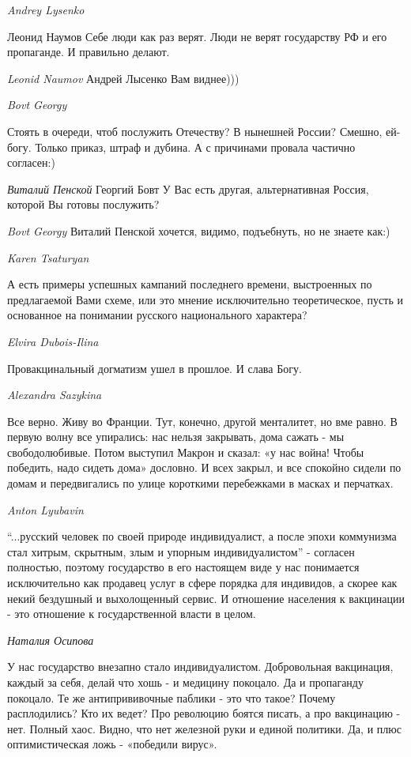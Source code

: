 \emph{Andrey Lysenko}

Леонид Наумов Себе люди как раз верят. Люди не верят государству РФ и его
пропаганде. И правильно делают.

\emph{Leonid Naumov}
Андрей Лысенко Вам виднее)))

\emph{Bovt Georgy}

Стоять в очереди, чтоб послужить Отечеству? В нынешней России? Смешно, ей-богу.
Только приказ, штраф и дубина. А с причинами провала частично согласен:)

\emph{Виталий Пенской}
Георгий Бовт У Вас есть другая, альтернативная Россия, которой Вы готовы послужить?

\emph{Bovt Georgy}
Виталий Пенской хочется, видимо, подъебнуть, но не знаете как:)

\emph{Karen Tsaturyan}

А есть примеры успешных кампаний последнего времени, выстроенных по
предлагаемой Вами схеме, или это мнение исключительно теоретическое, пусть и
основанное на понимании русского национального характера?

\emph{Elvira Dubois-Ilina}

Провакцинальный догматизм ушел в прошлое. И слава Богу.

\emph{Alexandra Sazykina}

Все верно. Живу во Франции. Тут, конечно, другой менталитет, но вме равно. В
первую волну все упирались: нас нельзя закрывать, дома сажать - мы
свободолюбивые. Потом выступил Макрон и сказал: «у нас война! Чтобы победить,
надо сидеть дома» дословно. И всех закрыл, и все спокойно сидели по домам и
передвигались по улице короткими перебежками в масках и перчатках.

\emph{Anton Lyubavin}

\enquote{...русский человек по своей природе индивидуалист, а после эпохи коммунизма
стал хитрым, скрытным, злым и упорным индивидуалистом} - согласен полностью,
поэтому государство в его настоящем виде у нас понимается исключительно как
продавец услуг в сфере порядка для индивидов, а скорее как некий бездушный и
выхолощенный сервис. И отношение населения к вакцинации - это отношение к
государственной власти в целом.

\emph{Наталия Осипова}

У нас государство внезапно стало индивидуалистом. Добровольная вакцинация,
каждый за себя, делай что хошь - и медицину покоцало. Да и пропаганду покоцало.
Те же антипрививочные паблики - это что такое? Почему расплодились? Кто их
ведет? Про революцию боятся писать, а про вакцинацию - нет. Полный хаос. Видно,
что нет железной руки и единой политики. Да, и плюс оптимистическая ложь -
«победили вирус».

